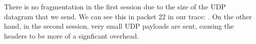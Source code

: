 There is no fragmentation in the first session due to the size of the UDP datagram that we send. We can see this in packet 22 in our trace: . On the other hand, in the second session, very small UDP payloads are sent, causing the headers to be more of a signficant overhead.